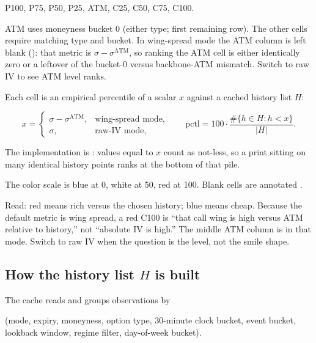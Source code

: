 \documentclass[11pt]{article}
\newcommand{\code}[1]{\texttt{\detokenize{#1}}}
\begin{document}
\begin{center}
\textsc{P100}, \textsc{P75}, \textsc{P50}, \textsc{P25},
\textsc{ATM}, \textsc{C25}, \textsc{C50}, \textsc{C75},
\textsc{C100}.
\end{center}

ATM uses moneyness bucket 0 (either type; first remaining row).
The other cells require matching type and bucket.
In wing-spread mode the ATM column is left blank (\code{n/a}):
that metric is \(\sigma-\sigma^{\mathrm{ATM}}\), so ranking the
ATM cell is either identically zero or a leftover of the
bucket-0 versus backbone-ATM mismatch.  Switch to raw IV to
see ATM level ranks.

Each cell is an empirical percentile of a scalar \(x\) against a
cached history list \(H\):

\begin{equation}
x
=
\begin{cases}
\sigma-\sigma^{\mathrm{ATM}}, & \text{wing-spread mode},\\
\sigma, & \text{raw-IV mode},
\end{cases}
\qquad
\mathrm{pctl}
=
100\cdot
\frac{\#\{h\in H:h<x\}}{|H|}.
\end{equation}

The implementation is \code{bisect_left}: values equal to \(x\) count
as not-less, so a print sitting on many identical history points
ranks at the bottom of that pile.

The color scale is blue at 0, white at 50, red at 100.
Blank cells are annotated \code{n/a}.

Read: red means rich versus the chosen history; blue means cheap.
Because the default metric is wing spread, a red C100 is ``that call
wing is high versus ATM relative to history,'' not ``absolute IV is
high.''  The middle ATM column is \code{n/a} in that mode.
Switch to raw IV when the question is the level, not the
smile shape.

\subsection{How the history list \(H\) is built}

The cache reads \code{heatmap_fact} and groups observations by

\begin{center}
(mode, expiry, moneyness, option type, 30-minute clock bucket,
event bucket, lookback window, regime filter, day-of-week bucket).
\end{center}
\end{document}
